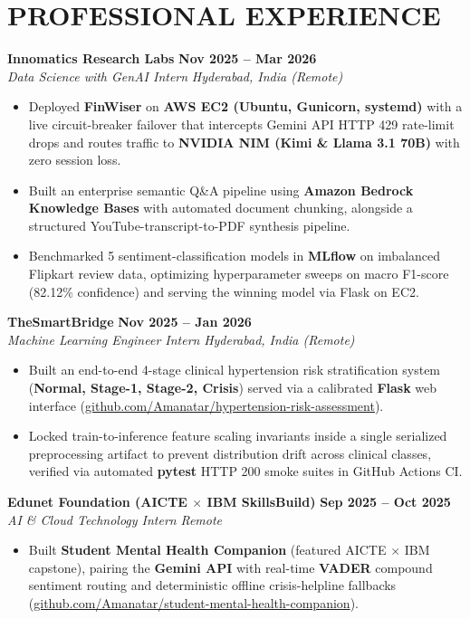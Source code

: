 \documentclass[10pt,a4paper]{article}
\begin{document}
\section*{PROFESSIONAL EXPERIENCE}
\noindent\textbf{Innomatics Research Labs} \hfill \textbf{Nov 2025 -- Mar 2026}\\
\textit{Data Science with GenAI Intern} \hfill \textit{Hyderabad, India (Remote)}
\begin{itemize}
    \item Deployed \textbf{FinWiser} on \textbf{AWS EC2 (Ubuntu, Gunicorn, systemd)} with a live circuit-breaker failover that intercepts Gemini API HTTP 429 rate-limit drops and routes traffic to \textbf{NVIDIA NIM (Kimi \& Llama 3.1 70B)} with zero session loss.
    \item Built an enterprise semantic Q\&A pipeline using \textbf{Amazon Bedrock Knowledge Bases} with automated document chunking, alongside a structured YouTube-transcript-to-PDF synthesis pipeline.
    \item Benchmarked 5 sentiment-classification models in \textbf{MLflow} on imbalanced Flipkart review data, optimizing hyperparameter sweeps on macro F1-score (82.12\% confidence) and serving the winning model via Flask on EC2.
\end{itemize}
\vspace{1pt}

\noindent\textbf{TheSmartBridge} \hfill \textbf{Nov 2025 -- Jan 2026}\\
\textit{Machine Learning Engineer Intern} \hfill \textit{Hyderabad, India (Remote)}
\begin{itemize}
    \item Built an end-to-end 4-stage clinical hypertension risk stratification system (\textbf{Normal, Stage-1, Stage-2, Crisis}) served via a calibrated \textbf{Flask} web interface (\href{https://github.com/Amanatar/hypertension-risk-assessment}{github.com/Amanatar/hypertension-risk-assessment}).
    \item Locked train-to-inference feature scaling invariants inside a single serialized preprocessing artifact to prevent distribution drift across clinical classes, verified via automated \textbf{pytest} HTTP 200 smoke suites in GitHub Actions CI.
\end{itemize}
\vspace{1pt}

\noindent\textbf{Edunet Foundation (AICTE $\times$ IBM SkillsBuild)} \hfill \textbf{Sep 2025 -- Oct 2025}\\
\textit{AI \& Cloud Technology Intern} \hfill \textit{Remote}
\begin{itemize}
    \item Built \textbf{Student Mental Health Companion} (featured AICTE $\times$ IBM capstone), pairing the \textbf{Gemini API} with real-time \textbf{VADER} compound sentiment routing and deterministic offline crisis-helpline fallbacks (\href{https://github.com/Amanatar/student-mental-health-companion}{github.com/Amanatar/student-mental-health-companion}).
\end{itemize}
\end{document}
